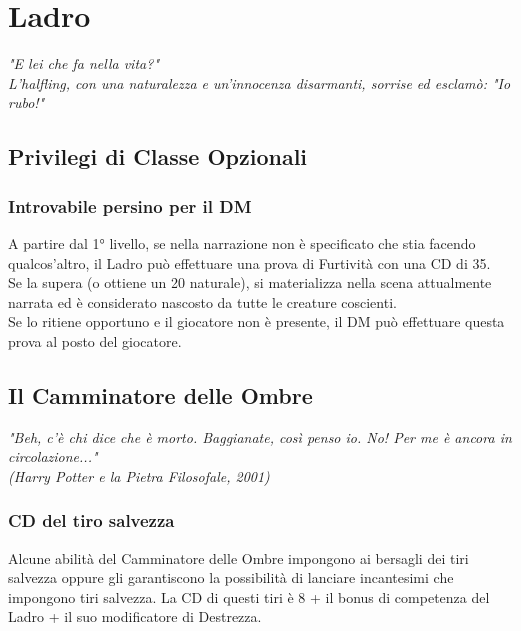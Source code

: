 \chapter{Ladro}

\begin{DndReadAloud}
  \it
  "E lei che fa nella vita?" \\ L'halfling, con una naturalezza e un'innocenza disarmanti, sorrise ed esclamò: "Io rubo!"
\end{DndReadAloud}

\section{Privilegi di Classe Opzionali}

\subsection{Introvabile persino per il DM}

A partire dal 1° livello, se nella narrazione non è specificato che stia facendo qualcos'altro, il Ladro può effettuare una prova di Furtività con una CD di 35. \\ Se la supera (o ottiene un 20 naturale), si materializza nella scena attualmente narrata ed è considerato nascosto da tutte le creature coscienti. \\ Se lo ritiene opportuno e il giocatore non è presente, il DM può effettuare questa prova al posto del giocatore.

\section{Il Camminatore delle Ombre}

\begin{DndReadAloud}
  \it
  "Beh, c'è chi dice che è morto. Baggianate, così penso io. No! Per me è ancora in circolazione..." \\ (Harry Potter e la Pietra Filosofale, 2001)
\end{DndReadAloud}

\subsection{CD del tiro salvezza}

Alcune abilità del Camminatore delle Ombre impongono ai bersagli dei tiri salvezza oppure gli garantiscono la possibilità di lanciare incantesimi che impongono tiri salvezza. La CD di questi tiri è 8 + il bonus di competenza del Ladro + il suo modificatore di Destrezza.


